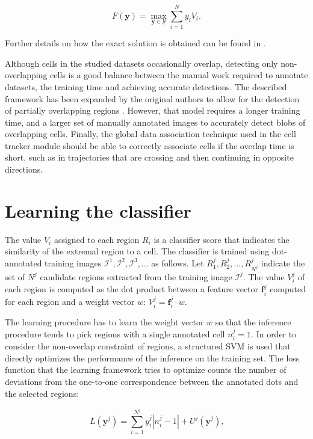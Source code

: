 	\[
		F(\textbf{y}) = \max_{\textbf{y} \in \mathcal{Y}} \sum_{i=1}^N y_i V_i \text{.}
	\]
	
	Further details on how the exact solution is obtained can be found in \cite{arteta12}.
	
	Although cells in the studied datasets occasionally overlap, detecting only non-overlapping cells is a good balance between the manual work required to annotate datasets, the training time and achieving accurate detections. The described framework has been expanded by the original authors to allow for the detection of partially overlapping regions \cite{arteta13}. However, that model requires a longer training time, and a larger set of manually annotated images to accurately detect blobs of overlapping cells. Finally, the global data association technique used in the cell tracker module should be able to correctly associate cells if the overlap time is short, such as in trajectories that are crossing and then continuing in opposite directions.
	
	
	\section{Learning the classifier \statusfirstdraft}
	\label{sec:detector_classifier}
	
	The value $V_i$ assigned to each region $R_i$ is a classifier score that indicates the similarity of the extremal region to a cell. The classifier is trained using dot-annotated training images $\mathcal{I}^1, \mathcal{I}^2, \mathcal{I}^3, \dots$ as follows. Let $R_1^j, R_2^j,\dots,R_{N^j}^j$ indicate the set of $N^j$ candidate regions extracted from the training image $\mathcal{I}^j$. The value $V_i^j$ of each region is computed as the dot product between a feature vector $\textbf{f}_i^j$ computed for each region and a weight vector $w$: $V_i^j = \textbf{f}_i^j \cdot w$.
	
	The learning procedure has to learn the weight vector $w$ so that the inference procedure tends to pick regions with a single annotated cell $n_i^j = 1$. In order to consider the non-overlap constraint of regions, a structured SVM \cite{tso04} is used that directly optimizes the performance of the inference on the training set. The loss function that the learning framework tries to optimize counts the number of deviations from the one-to-one correspondence between the annotated dots and the selected regions:
	
	\[
		L(\textbf{y}^j) = \sum_{i=1}^{N^j} y_i^j |n_i^j - 1| + U^j(\textbf{y}^j)\text{,}
	\]
	
